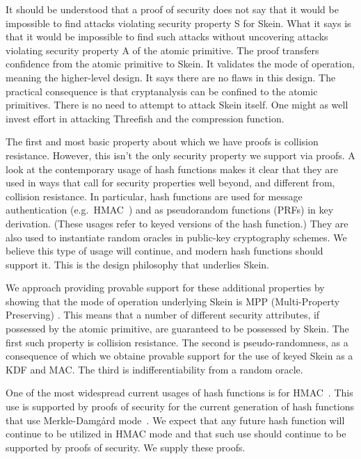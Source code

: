 \documentclass[11pt,twoside]{article}
\begin{document}
It should be understood that a proof of security does not say that it would be impossible to find attacks violating security property S for Skein.  What it says is that it would be impossible to find such attacks without uncovering attacks violating security property A of the atomic primitive.  The proof transfers confidence from the atomic primitive to Skein.  It validates the mode of operation, meaning the higher-level design.  It says there are no flaws in this design.  The practical consequence is that cryptanalysis can be confined to the atomic primitives.  There is no need to attempt to attack Skein itself.  One might as well invest effort in attacking Threefish and the compression function.

The first and most basic property about which we have proofs is collision resistance.  However, this isn't the only security property we support via proofs.  A look at the contemporary usage of hash functions makes it clear that they are used in ways that call for security properties well beyond, and different from, collision resistance.  In particular, hash functions are used for message authentication (e.g.~HMAC~\cite{HMAC1,B06}) and as pseudorandom functions (PRFs) in key derivation. (These usages refer to keyed versions of the hash function.) They are also used to instantiate random oracles in public-key cryptography schemes.  We believe this type of usage will continue, and modern hash functions should support it.  This is the design philosophy that underlies Skein.

We approach providing provable support for these additional properties by showing that the mode of operation underlying Skein is MPP (Multi-Property Preserving) \cite{BR06}. This means that a number of different security attributes, if possessed by the atomic primitive, are guaranteed to be possessed by Skein. The first such property is collision resistance.  The second is pseudo-randomness, as a consequence of which we obtaine provable support for the use of keyed Skein as a KDF and MAC.  The third is indifferentiability from a random oracle.

One of the most widespread current usages of hash functions is for HMAC~\cite{HMAC1,HMAC2}.  This use is supported by proofs of security for the current generation of hash functions that use Merkle-Damg{\aa}rd mode~\cite{HMAC1,B06}.  We expect that any future hash function will continue to be utilized in HMAC mode and that such use should continue to be supported by proofs of security.  We supply these proofs.
\end{document}
